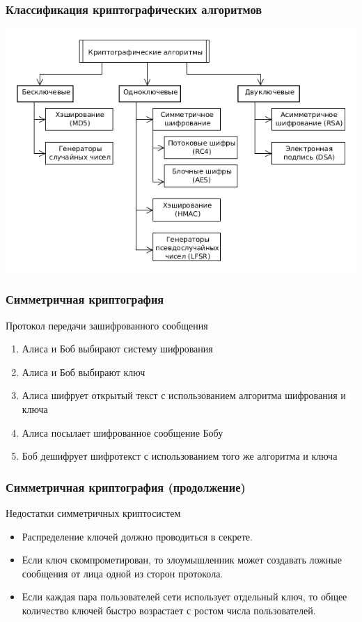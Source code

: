 \documentclass{beamer}
\begin{document}
\begin{frame}
  \frametitle{Классификация криптографических алгоритмов}

  \includegraphics[width=\linewidth]{./imgs/CA_classification.png}

\end{frame}

\begin{frame}
  \frametitle{Симметричная криптография}

  \begin{block}{Протокол передачи зашифрованного сообщения}
  \begin{enumerate}
    \item{Алиса и Боб выбирают систему шифрования}
    \item{Алиса и Боб выбирают ключ}
    \item{Алиса шифрует открытый текст с использованием алгоритма шифрования и ключа}
    \item{Алиса посылает шифрованное сообщение Бобу}
    \item{Боб дешифрует шифротекст с использованием того же алгоритма и ключа}
  \end{enumerate}
  \end{block}
\end{frame}


\begin{frame}
  \frametitle{Симметричная криптография (продолжение)}

  \begin{block} {Недостатки симметричных криптосистем}
  \begin{itemize}
    \item{Распределение ключей должно проводиться в секрете.}
    \item{Если ключ скомпрометирован, то злоумышленник может создавать ложные сообщения от лица одной из сторон протокола.}
    \item{Если каждая пара пользователей сети использует отдельный ключ, то общее количество ключей быстро 
          возрастает с ростом числа пользователей.}
  \end{itemize}
  \end{block}
\end{frame}
\end{document}

